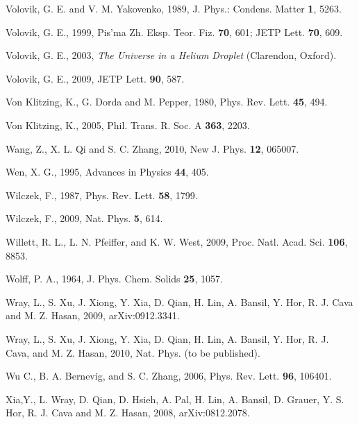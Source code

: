 \documentclass[twocolumn,floatfix,showpacs,rmp,aps]{revtex4}
\begin{document}
\begin{thebibliography}{99}
		Volovik, G. E. and V. M. Yakovenko, 1989,
		J. Phys.: Condens. Matter {\bf 1}, 5263.
		
		Volovik, G. E., 1999,
		Pis'ma Zh. Eksp. Teor. Fiz. {\bf 70}, 601; JETP Lett. {\bf 70}, 609.
		
		Volovik, G. E., 2003,
		{\it The Universe in a Helium Droplet} (Clarendon, Oxford).
		
		Volovik, G. E., 2009,
		JETP Lett. {\bf 90}, 587.
		
		Von Klitzing, K., G. Dorda and M. Pepper, 1980,
		Phys. Rev. Lett. {\bf 45}, 494.
		
		Von Klitzing, K., 2005,
		Phil. Trans. R. Soc. A {\bf 363}, 2203.
		
		Wang, Z., X. L. Qi and S. C. Zhang, 2010,
		New J. Phys. {\bf 12}, 065007.
		
		Wen, X. G., 1995,
		Advances in Physics {\bf 44}, 405.
		
		Wilczek, F., 1987,
		Phys. Rev. Lett. {\bf 58}, 1799.
		
		Wilczek, F., 2009,
		Nat. Phys. {\bf 5}, 614.
		
		Willett, R. L., L. N. Pfeiffer, and K. W. West, 2009,
		Proc. Natl. Acad. Sci. {\bf 106}, 8853.
		
		Wolff, P. A., 1964,
		J. Phys. Chem. Solids {\bf 25}, 1057.
		
		
		Wray, L., S. Xu, J. Xiong, Y. Xia, D. Qian, H. Lin, A. Bansil, Y. Hor, R. J. Cava and M. Z. Hasan, 2009,
		arXiv:0912.3341.
		
		Wray, L., S. Xu, J. Xiong, Y. Xia, D. Qian, H. Lin, A. Bansil, Y.
		Hor, R. J. Cava, and M. Z. Hasan, 2010, Nat. Phys. (to be
		published).
		
		Wu C., B. A. Bernevig, and S. C. Zhang, 2006,
		Phys. Rev. Lett. {\bf 96}, 106401.
		
		Xia,Y., L. Wray, D. Qian, D. Hsieh, A. Pal, H. Lin, A. Bansil, D. Grauer,
		Y. S. Hor, R. J. Cava and M. Z. Hasan, 2008,
		arXiv:0812.2078.
		

\end{thebibliography}
\end{document}
